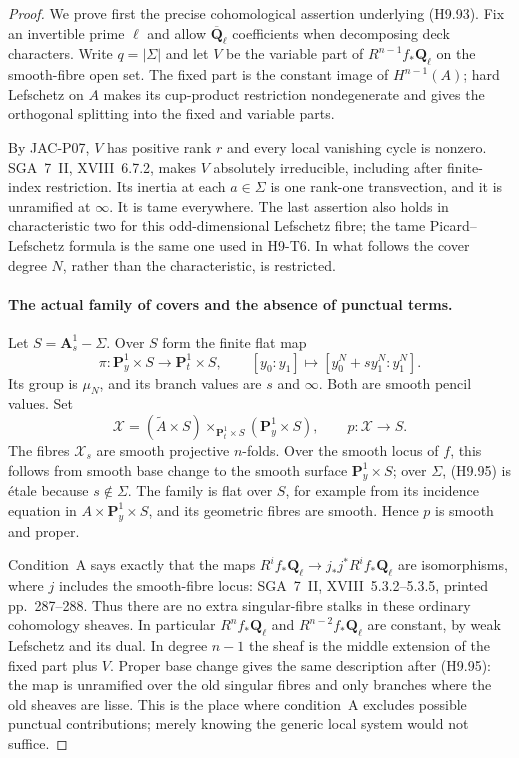 \begin{proof}
We prove first the precise cohomological assertion underlying
(H9.93). Fix an invertible prime $\ell$ and allow
$\overline{\mathbf Q}_\ell$ coefficients when decomposing deck
characters. Write $q=|\Sigma|$ and let $V$ be the variable part of
$R^{n-1}f_*\mathbf Q_\ell$ on the smooth-fibre open set. The
fixed part is the constant image of $H^{n-1}(A)$; hard Lefschetz
on $A$ makes its cup-product restriction nondegenerate and gives
the orthogonal splitting into the fixed and variable parts.

By JAC-P07, $V$ has positive rank $r$ and every local vanishing
cycle is nonzero. SGA~7~II, XVIII~6.7.2, makes $V$ absolutely
irreducible, including after finite-index restriction. Its
inertia at each $a\in\Sigma$ is one rank-one transvection,
and it is unramified at $\infty$. It is tame everywhere. The
last assertion also holds in characteristic two for this
odd-dimensional Lefschetz fibre; the tame Picard--Lefschetz
formula is the same one used in H9-T6. In what follows the
cover degree $N$, rather than the characteristic, is restricted.

\paragraph{The actual family of covers and the absence of punctual terms.}
Let $S=\mathbf A^1_s-\Sigma$. Over $S$ form the finite flat map
\[
 \pi:\mathbf P^1_y\times S\longrightarrow\mathbf P^1_t\times S,
 \qquad [y_0:y_1]\longmapsto
                 [y_0^N+s y_1^N:y_1^N].
                                                               \tag{H9.95}
\]
Its group is $\mu_N$, and its branch values are $s$ and $\infty$.
Both are smooth pencil values. Set
\[
 \mathscr X=(\widetilde A\times S)
                   \times_{\mathbf P^1_t\times S}
                          (\mathbf P^1_y\times S),
 \qquad p:\mathscr X\longrightarrow S.
\]
The fibres $\mathcal X_s$ are smooth projective $n$-folds.
Over the smooth locus of $f$, this follows from smooth base
change to the smooth surface $\mathbf P^1_y\times S$; over
$\Sigma$, (H9.95) is \'etale because $s\notin\Sigma$.
The family is flat over $S$, for example from its incidence
equation in $A\times\mathbf P^1_y\times S$, and its geometric
fibres are smooth. Hence $p$ is smooth and proper.

Condition~A says exactly that the maps
$R^i f_*\mathbf Q_\ell\to j_*j^*R^i f_*\mathbf Q_\ell$ are
isomorphisms, where $j$ includes the smooth-fibre locus:
SGA~7~II, XVIII~5.3.2--5.3.5, printed pp.~287--288.
Thus there are no extra singular-fibre stalks in these ordinary
cohomology sheaves. In particular $R^n f_*\mathbf Q_\ell$ and
$R^{n-2}f_*\mathbf Q_\ell$ are constant, by weak Lefschetz and
its dual. In degree $n-1$ the sheaf is the middle extension of
the fixed part plus $V$. Proper base change gives the same
description after (H9.95): the map is unramified over the old
singular fibres and only branches where the old sheaves are
lisse. This is the place where condition~A excludes possible
punctual contributions; merely knowing the generic local
system would not suffice.


\end{proof}
